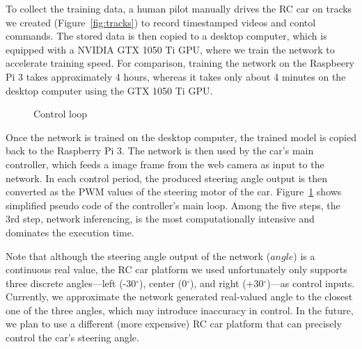 To collect the training data, a human pilot manually drives the RC car
on tracks we created (Figure~\ref{fig:tracks}) to record
timestamped videos and contol commands. The stored data is then copied 
to a desktop computer, which is equipped with a NVIDIA GTX 1050 Ti GPU, 
where we train the network to accelerate training speed. 
For comparison, training the network on the Raspbeery Pi 3 takes
approximately 4 hours, whereas it takes only about 4 minutes on the
desktop computer using the GTX 1050 Ti GPU.

\begin{figure}[h]
  
  \caption{Control loop}
  \label{fig:controlloop}
\end{figure}

Once the network is trained on the desktop computer, the trained model
is copied back to the Raspberry Pi 3. The network is then used
by the car's main controller, which feeds a image frame from the web
camera as input to the network. In each control period, the produced 
steering angle output is then converted as the PWM values of the 
steering motor of the car. Figure~\ref{fig:controlloop} shows simplified 
pseudo code of the controller's main loop. Among the five steps, the 3rd step, 
network inferencing, is the most computationally intensive and dominates the
execution time.

Note that although the steering angle output of the network ($angle$) is
a continuous real value, the RC car platform we used unfortunately
only supports three discrete angles---left (-30$^{\circ}$), center
(0$^{\circ}$), and right (+30$^{\circ}$)---as control inputs.
Currently, we approximate the network generated real-valued
angle to the closest one of the three angles, which may
introduce inaccuracy in control.
In the future, we plan to use a different (more expensive) RC car
platform that can precisely control the car's steering angle.

